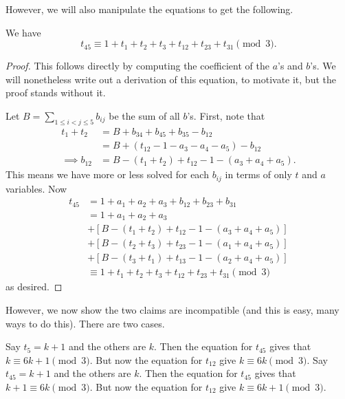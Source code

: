However, we will also manipulate the equations to get the following.
\begin{claim*}
  We have
  \[ t_{45} \equiv 1 + t_1 + t_2 + t_3 + t_{12} + t_{23} + t_{31} \pmod 3. \]
\end{claim*}
\begin{proof}
  This follows directly by computing the coefficient of the $a$'s and $b$'s.
  We will nonetheless write out a derivation of this equation, to
  motivate it, but the proof stands without it.

  Let $B = \sum_{1 \le i < j \le 5} b_{ij}$ be the sum of all $b$'s.
  First, note that
  \begin{align*}
    t_1 + t_2 &= B + b_{34} + b_{45} + b_{35} - b_{12} \\
    &= B + \left( t_{12}-1-a_3-a_4-a_5 \right) - b_{12} \\
    \implies b_{12} &= B - (t_1 + t_2) + t_{12} - 1 - (a_3+a_4+a_5).
  \end{align*}
  This means we have more or less solved for each $b_{ij}$
  in terms of only $t$ and $a$ variables.
  Now
  \begin{align*}
    t_{45} &= 1 + a_1 + a_2 + a_3 + b_{12} + b_{23} + b_{31} \\
    &= 1 + a_1 + a_2 + a_3 \\
      &+ [B - (t_1 + t_2) + t_{12} - 1 - (a_3+a_4+a_5)] \\
      &+ [B - (t_2 + t_3) + t_{23} - 1 - (a_1+a_4+a_5)] \\
      &+ [B - (t_3 + t_1) + t_{13} - 1 - (a_2+a_4+a_5)] \\
    &\equiv 1 + t_1 + t_2 + t_3 + t_{12} + t_{23} + t_{31} \pmod 3
  \end{align*}
  as desired.
\end{proof}

However, we now show the two claims are incompatible
(and this is easy, many ways to do this).
There are two cases.
\begin{itemize}
  \ii Say $t_5 = k+1$ and the others are $k$.
  Then the equation for $t_{45}$ gives that $k \equiv 6k+1 \pmod 3$.
  But now the equation for $t_{12}$ give $k \equiv 6k \pmod 3$.
  \ii Say $t_{45} = k+1$ and the others are $k$.
  Then the equation for $t_{45}$ gives that $k+1 \equiv 6k \pmod 3$.
  But now the equation for $t_{12}$ give $k \equiv 6k+1 \pmod 3$.
\end{itemize}


